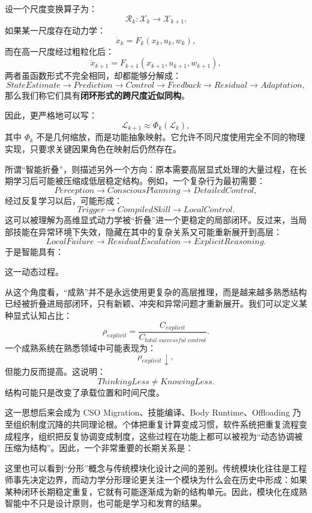 设一个尺度变换算子为：
\[
\mathcal R_k:
\mathcal X_k
\rightarrow
\mathcal X_{k+1}.
\]
如果某一尺度存在动力学：
\[
\dot x_k
=
F_k(x_k,u_k,w_k),
\]
而在高一尺度经过粗粒化后：
\[
\dot x_{k+1}
=
F_{k+1}(x_{k+1},u_{k+1},w_{k+1}),
\]
两者虽函数形式不完全相同，却都能够分解成：
\[
StateEstimate
\rightarrow
Prediction
\rightarrow
Control
\rightarrow
Feedback
\rightarrow
Residual
\rightarrow
Adaptation,
\]
那么我们称它们具有\textbf{闭环形式的跨尺度近似同构}。

因此，更严格地可以写：
\[
\boxed{
\mathcal L_{k+1}
\approx
\Phi_k(\mathcal L_k),
}
\]
其中 $\Phi_k$ 不是几何缩放，而是功能抽象映射。它允许不同尺度使用完全不同的物理实现，只要求关键因果角色在映射后仍然存在。

所谓“智能折叠”，则描述另外一个方向：原本需要高层显式处理的大量过程，在长期学习后可能被压缩成低层稳定结构。例如，一个复杂行为最初需要：
\[
Perception
\rightarrow
ConsciousPlanning
\rightarrow
DetailedControl,
\]
经过反复学习以后，可能形成：
\[
Trigger
\rightarrow
CompiledSkill
\rightarrow
LocalControl.
\]
这可以被理解为高维显式动力学被“折叠”进一个更稳定的局部闭环。反过来，当局部技能在异常环境下失效，隐藏在其中的复杂关系又可能重新展开到高层：
\[
LocalFailure
\rightarrow
ResidualEscalation
\rightarrow
ExplicitReasoning.
\]
于是智能具有：
\begin{statementbox}
\centering
{}
\end{statementbox}
这一动态过程。

从这个角度看，“成熟”并不是永远使用更复杂的高层推理，而是越来越多熟悉结构已经被折叠进局部闭环，只有新颖、冲突和异常问题才重新展开。我们可以定义某种显式认知占比：
\[
\rho_{explicit}
=
\frac{C_{explicit}}
{C_{total\;successful\;control}}.
\]
一个成熟系统在熟悉领域中可能表现为：
\[
\rho_{explicit}\downarrow,
\]
但能力反而提高。这说明：
\[
\boxed{
ThinkingLess
\neq
KnowingLess.
}
\]
结构可能只是改变了承载位置和时间尺度。

这一思想后来会成为 CSO Migration、技能编译、Body Runtime、Offloading 乃至组织制度沉降的共同理论根。个体把重复计算变成习惯，软件系统把重复流程变成程序，组织把反复协调变成制度，这些过程在功能上都可以被视为“动态协调被压缩为结构”。因此，一个非常重要的长期关系是：
\begin{statementbox}
\centering
{}
\end{statementbox}

这里也可以看到“分形”概念与传统模块化设计之间的差别。传统模块化往往是工程师事先决定边界，而动力学分形理论更关注一个模块为什么会在历史中形成：如果某种闭环长期稳定重复，它就有可能逐渐成为新的结构单元。因此，模块化在成熟智能中不只是设计原则，也可能是学习和发育的结果。

